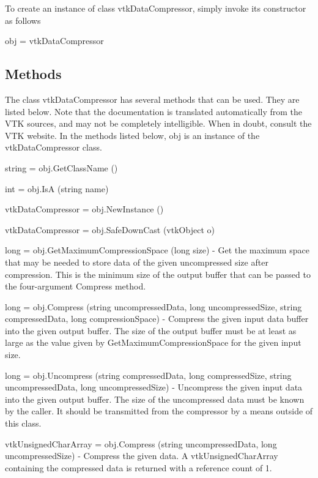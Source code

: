 To create an instance of class vtk\-Data\-Compressor, simply invoke its constructor as follows \begin{DoxyVerb}  obj = vtkDataCompressor
\end{DoxyVerb}
 \hypertarget{vtkwidgets_vtkxyplotwidget_Methods}{}\subsection{Methods}\label{vtkwidgets_vtkxyplotwidget_Methods}
The class vtk\-Data\-Compressor has several methods that can be used. They are listed below. Note that the documentation is translated automatically from the V\-T\-K sources, and may not be completely intelligible. When in doubt, consult the V\-T\-K website. In the methods listed below, {\ttfamily obj} is an instance of the vtk\-Data\-Compressor class. 
\begin{DoxyItemize}
\item {\ttfamily string = obj.\-Get\-Class\-Name ()}  
\item {\ttfamily int = obj.\-Is\-A (string name)}  
\item {\ttfamily vtk\-Data\-Compressor = obj.\-New\-Instance ()}  
\item {\ttfamily vtk\-Data\-Compressor = obj.\-Safe\-Down\-Cast (vtk\-Object o)}  
\item {\ttfamily long = obj.\-Get\-Maximum\-Compression\-Space (long size)} -\/ Get the maximum space that may be needed to store data of the given uncompressed size after compression. This is the minimum size of the output buffer that can be passed to the four-\/argument Compress method.  
\item {\ttfamily long = obj.\-Compress (string uncompressed\-Data, long uncompressed\-Size, string compressed\-Data, long compression\-Space)} -\/ Compress the given input data buffer into the given output buffer. The size of the output buffer must be at least as large as the value given by Get\-Maximum\-Compression\-Space for the given input size.  
\item {\ttfamily long = obj.\-Uncompress (string compressed\-Data, long compressed\-Size, string uncompressed\-Data, long uncompressed\-Size)} -\/ Uncompress the given input data into the given output buffer. The size of the uncompressed data must be known by the caller. It should be transmitted from the compressor by a means outside of this class.  
\item {\ttfamily vtk\-Unsigned\-Char\-Array = obj.\-Compress (string uncompressed\-Data, long uncompressed\-Size)} -\/ Compress the given data. A vtk\-Unsigned\-Char\-Array containing the compressed data is returned with a reference count of 1.  

\end{DoxyItemize}
